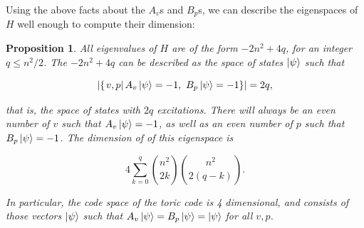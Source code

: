 \documentclass{article}
\newtheorem{proposition}{Proposition}[section]
\theoremstyle{definition}
\numberwithin{figure}{section}
\begin{document}
Using the above facts about the $A_v$s and $B_p$s, we can describe the eigenspaces of $H$ well enough to compute their dimension:

\begin{proposition}\label{eigenspaces} All eigenvalues of $H$ are of the form $-2n^2+4q$, for an integer $q\leq n^2/2$. The $-2n^2+4q$ can be described as the space of states $\left|\psi\right>$ such that

$$\left|\left\{\left. v,p\right| A_v\left|\psi\right> =-1,\,\, B_p\left|\psi\right>=-1\right\}\right|=2q,$$

that is, the space of states with $2q$ excitations. There will always be an even number of $v$ such that $A_v\left|\psi\right> =-1$, as well as an even number of $p$ such that $B_p\left|\psi\right>=-1$. The dimension of of this eigenspace is

$$4\sum_{k=0}^{q}{n^2 \choose 2k} {n^2 \choose 2(q-k)}.$$

In particular, the code space of the toric code is 4 dimensional, and consists of those vectors $\left|\psi\right>$ such that $A_v\left|\psi\right>=B_p\left|\psi\right>=\left|\psi\right>$ for all $v,p$.
\end{proposition}
\end{document}
